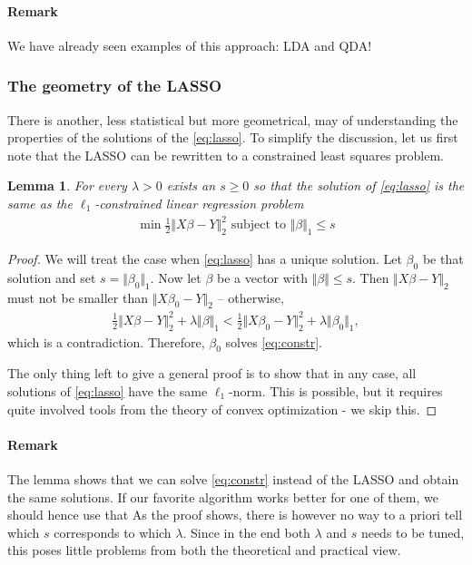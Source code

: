 \documentclass{article}
\newtheorem{lemma}{Lemma}
\newcommand{\norm}[1]{\Vert #1 \Vert}
\begin{document}
\paragraph{Remark} We have already seen examples of this approach: LDA and QDA!

\subsubsection{The geometry of the LASSO} There is another, less statistical but more geometrical, may of  understanding the properties of the solutions of the \eqref{eq:lasso}. To simplify the discussion, let us first note that the LASSO can be rewritten to a constrained least squares problem.
\begin{lemma}
    For every $\lambda>0$ exists an $s\geq 0 $ so that the solution of \eqref{eq:lasso} is the same as the $\ell_1$-constrained linear regression problem
\begin{align}
    \min \tfrac{1}{2}\norm{X\beta-Y}_2^2 \text{ subject to } \norm{\beta}_1 \leq s \label{eq:constr}
\end{align}
\end{lemma} 
\begin{proof}
    We will treat the case when \eqref{eq:lasso} has a unique solution. Let $\beta_0$ be that solution and set $s = \norm{\beta_0}_1$. Now let $\beta$ be a vector with $\norm{\beta} \leq s$. Then $\norm{X\beta-Y}_2$ must not be smaller than $\norm{X\beta_0 -Y}_2$ -- otherwise,
    \begin{align*}
        \tfrac{1}{2}\norm{X\beta-Y}_2^2 + \lambda \norm{\beta}_1 < \tfrac{1}{2}\norm{X\beta_0-Y}_2^2 + \lambda \norm{\beta_0}_1, 
    \end{align*}
    which is a contradiction. Therefore, $\beta_0$ solves \eqref{eq:constr}. 

    The only thing left to give a general proof is to show that in any case, all solutions of \eqref{eq:lasso} have the same $\ell_1$-norm. This is possible, but it requires quite involved tools from the theory of convex optimization - we skip this.
\end{proof}

\paragraph{Remark} The lemma shows that we can solve \eqref{eq:constr} instead of the LASSO and obtain the same solutions. If our favorite algorithm works better for one of them, we should hence use that  As the proof shows, there is however no way to a priori tell which $s$ corresponds to which $\lambda$. Since in the end both $\lambda$ and $s$ needs to be tuned, this poses little problems from both the theoretical and practical view.
\end{document}
